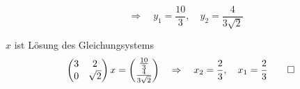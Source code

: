 \begin{loesung}
\begin{teilaufgaben}
\[\quad
\Rightarrow
\quad
y_1=\frac{10}{3},\quad y_2=\frac{4}{3\sqrt{2}}
\]
\item $x$ ist Lösung des Gleichungsystems
\[
\begin{pmatrix}
3&2\\
0&\sqrt{2}
\end{pmatrix}x=\begin{pmatrix}
\frac{10}{3}\\
\frac{4}{3\sqrt{2}}
\end{pmatrix}
\quad\Rightarrow\quad
x_2=\frac23,\quad x_1=\frac23
\qedhere
\]
\end{teilaufgaben}
\end{loesung}

